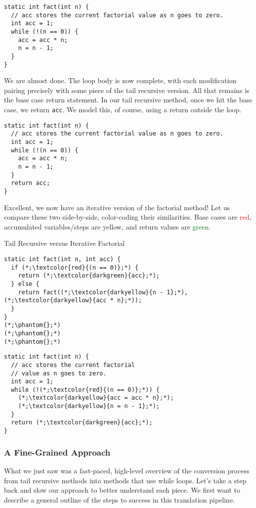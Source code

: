 \begin{lstlisting}[language=MyJava]
static int fact(int n) {
  // acc stores the current factorial value as n goes to zero.
  int acc = 1;
  while (!(n == 0)) {
    acc = acc * n;
    n = n - 1;
  }
}
\end{lstlisting}

We are almost done. The loop body is now complete, with each modification pairing precisely with some piece of the tail recursive version. All that remains is the base case return statement. In our tail recursive method, once we hit the base case, we return \texttt{acc}. We model this, of course, using a return outside the loop.

\begin{lstlisting}[language=MyJava]
static int fact(int n) {
  // acc stores the current factorial value as n goes to zero.
  int acc = 1;
  while (!(n == 0)) {
    acc = acc * n;
    n = n - 1;
  }
  return acc;
}
\end{lstlisting}

Excellent, we now have an iterative version of the factorial method! Let us compare these two side-by-side, color-coding their similarities. Base cases are \textcolor{red}{red}, accumulated variables/steps are \textcolor{darkyellow}{yellow}, and return values are \textcolor{darkgreen}{green}. 

\begin{clrr}[]{Tail Recursive versus Iterative Factorial}
\begin{lstlisting}[language=MyJava]
static int fact(int n, int acc) {
  if (*;\textcolor{red}{(n == 0)};*) {
    return (*;\textcolor{darkgreen}{acc};*);
  } else {
    return fact((*;\textcolor{darkyellow}{n - 1};*), (*;\textcolor{darkyellow}{acc * n};*));
  }
}
(*;\phantom{};*)
(*;\phantom{};*)
(*;\phantom{};*)
\end{lstlisting}
\tcblower
\begin{lstlisting}[language=MyJavaNLN]
static int fact(int n) {
  // acc stores the current factorial
  // value as n goes to zero.
  int acc = 1;
  while (!(*;\textcolor{red}{(n == 0)};*)) {
    (*;\textcolor{darkyellow}{acc = acc * n};*);
    (*;\textcolor{darkyellow}{n = n - 1};*);
  }
  return (*;\textcolor{darkgreen}{acc};*);
}
\end{lstlisting}
\end{clrr}

\subsubsection*{A Fine-Grained Approach}
What we just saw was a fast-paced, high-level overview of the conversion process from tail recursive methods into methods that use while loops. Let’s take a step back and slow our approach to better understand each piece. We first want to describe a general outline of the steps to success in this translation pipeline. 

